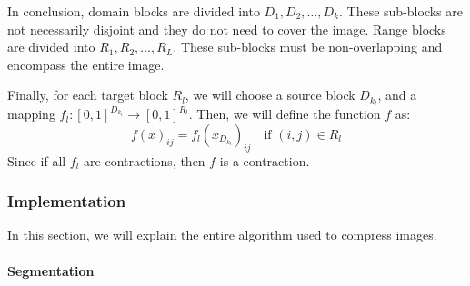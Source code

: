 \documentclass[a4paper,11pt, titlepage]{article}
\theoremstyle{definition}
\theoremstyle{plain}
\theoremstyle{remark}
\theoremstyle{definition}
\begin{document}
In conclusion, domain blocks are divided into \( D_1, D_2, \ldots, D_k \). These sub-blocks are not necessarily disjoint and they do not need to cover the image. Range blocks are divided into \( R_1, R_2, \ldots, R_L \). These sub-blocks must be non-overlapping and encompass the entire image.

Finally, for each target block \( R_l \), we will choose a source block \( D_{k_l} \), and a mapping \( f_l : [0, 1]^{D_{k_l}} \rightarrow [0, 1]^{R_l} \). Then, we will define the function \( f \) as:
\[
f(x)_{ij} = f_l(x_{D_{k_l}})_{ij} \quad \text{if } (i,j) \in R_l
\]
Since if all \( f_l \) are contractions, then \( f \) is a contraction.




\subsubsection{Implementation}
In this section, we will explain the entire algorithm used to compress images.

\paragraph{Segmentation}
\end{document}
